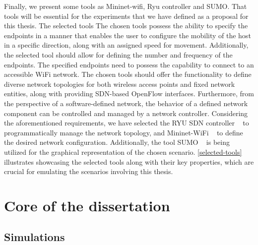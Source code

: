 \documentclass[
  oneside,
  11pt, a4paper,
  footinclude=true,
  headinclude=true,
  cleardoublepage=empty
]{scrbook}
\begin{document}
Finally, we present some tools as Mininet-wifi, Ryu controller and SUMO. That tools will be essential for the experiments that we have defined as a proposal for this thesis. The selected tools The chosen tools possess the ability to specify the endpoints in a manner that enables the user to configure the mobility of the host in a specific direction, along with an assigned speed for movement. Additionally, the selected tool should allow for defining the number and frequency of the endpoints. 
The specified endpoints need to possess the capability to connect to an accessible WiFi network. The chosen tools should offer the functionality to define diverse network topologies for both wireless access points and fixed network entities, along with providing SDN-based OpenFlow interfaces. Furthermore, from the perspective of a software-defined network, the behavior of a defined network component can be controlled and managed by a network controller.
Considering the aforementioned requirements, we have selected the RYU SDN controller ~\cite{RyuController} to programmatically manage the network topology, and Mininet-WiFi ~\cite{mininet-wifibook} to define the desired network configuration. Additionally, the tool SUMO ~\cite{dlr127994} is being utilized for the graphical representation of the chosen scenario. \ref{selected-tools} illustrates  showcasing the selected tools along with their key properties, which are crucial for emulating the scenarios involving this thesis.











\part{Core of the dissertation}%


\chapter{{Simulations}}
\end{document}

